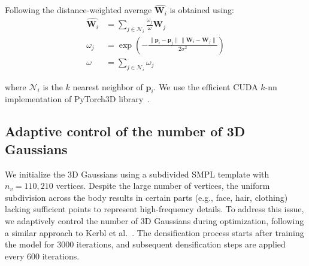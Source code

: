 Following \cite{chen2021animatable,Zheng2020PaMIRPM} the distance-weighted average $\hat{\bm{W}_i}$ is obtained using:
\begin{align}
    \hat{\bm{W}_i} &= \sum_{j \in \mathcal{N}_i}  \frac{\omega_j}{\omega} \bm{W}_j \label{eq:lbsquery}\\
    \omega_j &= \exp \left( {-\frac{\| \bm{p}_i - \bm{p}_j \| \| \bm{W}_i - \bm{W}_j \|}{2\sigma^2}} \right) \\
    \omega &= \sum_{j \in \mathcal{N}_i} \omega_j
\end{align}

where $\mathcal{N}_i$ is the $k$ nearest neighbor of $\bm{p}_i$. We use the efficient CUDA $k$-nn implementation of PyTorch3D library~\cite{ravi2020pytorch3d}.


\subsection{Adaptive control of the number of 3D Gaussians}
We initialize the 3D Gaussians using a subdivided SMPL template with $n_v=110,210$ vertices. Despite the large number of vertices, the uniform subdivision across the body results in certain parts (e.g., face, hair, clothing) lacking sufficient points to represent high-frequency details. To address this issue, we adaptively control the number of 3D Gaussians during optimization, following a similar approach to Kerbl et al.~\cite{kerbl3Dgaussians}. The densification process starts after training the model for 3000 iterations, and subsequent densification steps are applied every 600 iterations.


